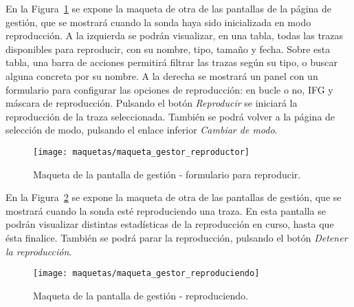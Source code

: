 En la Figura~\ref{fig:maqueta:gestor_reproductor} se expone la maqueta de otra de las pantallas de la página de gestión, que se mostrará cuando la sonda haya sido inicializada en modo reproducción.
A la izquierda se podrán visualizar, en una tabla, todas las \glspl{traza} disponibles para reproducir, con su nombre, tipo, tamaño y fecha.
Sobre esta tabla, una barra de acciones permitirá filtrar las \glspl{traza} según su tipo, o buscar alguna concreta por su nombre.
A la derecha se mostrará un panel con un formulario para configurar las opciones de reproducción: en bucle o no, \gls{IFG} y máscara de reproducción.
Pulsando el botón \textit{Reproducir} se iniciará la reproducción de la traza seleccionada.
También se podrá volver a la página de selección de modo, pulsando el enlace inferior \textit{Cambiar de modo}.
\begin{figure}[!htp]
  \centering
  \texttt{[image: maquetas/maqueta\_gestor\_reproductor]}
  \caption{Maqueta de la pantalla de gestión - formulario para reproducir.}
  \label{fig:maqueta:gestor_reproductor}
\end{figure}
\clearpage

En la Figura~\ref{fig:maqueta:gestor_reproduciendo} se expone la maqueta de otra de las pantallas de gestión, que se mostrará cuando la sonda esté reproduciendo una \gls{traza}.
En esta pantalla se podrán visualizar distintas estadísticas de la reproducción en curso, hasta que ésta finalice.
También se podrá parar la reproducción, pulsando el botón \textit{Detener la reproducción}.
\begin{figure}[!htp]
  \centering
  \texttt{[image: maquetas/maqueta\_gestor\_reproduciendo]}
  \caption{Maqueta de la pantalla de gestión - reproduciendo.}
  \label{fig:maqueta:gestor_reproduciendo}
\end{figure}